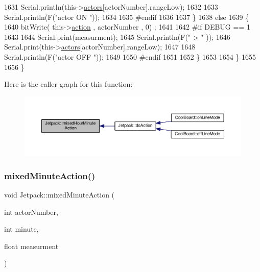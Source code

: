 \begin{DoxyCode}
1631             Serial.println(this->\hyperlink{class_jetpack_a7e16d2f97837f9712a2e6de1c50d99db}{actors}[actorNumber].rangeLow);
1632 
1633             Serial.println(F(\textcolor{stringliteral}{"actor ON "}));
1634 
1635 \textcolor{preprocessor}{        #endif  }
1636 
1637         \}
1638         \textcolor{keywordflow}{else} 
1639         \{
1640             bitWrite( this->\hyperlink{class_jetpack_aca3142925a7b0834b34ae91d26af7765}{action} , actorNumber , 0) ;
1641 
1642 \textcolor{preprocessor}{        #if DEBUG == 1 }
1643 
1644             Serial.print(measurment);
1645             Serial.println(F(\textcolor{stringliteral}{" > "} ));
1646             Serial.print(this->\hyperlink{class_jetpack_a7e16d2f97837f9712a2e6de1c50d99db}{actors}[actorNumber].rangeLow);
1647 
1648             Serial.println(F(\textcolor{stringliteral}{"actor OFF "}));
1649 
1650 \textcolor{preprocessor}{        #endif  }
1651             
1652         \}
1653     
1654     \}
1655 
1656 \}
\end{DoxyCode}
Here is the caller graph for this function\+:\nopagebreak
\begin{figure}[H]
\begin{center}
\leavevmode
\includegraphics[width=350pt]{df/d1d/class_jetpack_a273dae1517b56f0242e28b8944edc26b_icgraph}
\end{center}
\end{figure}
\mbox{\label{class_jetpack_acf8ed1fb594b9e8e224f4ed872a8e093}} 
\subsubsection{\texorpdfstring{mixed\+Minute\+Action()}{mixedMinuteAction()}}
{\footnotesize\ttfamily void Jetpack\+::mixed\+Minute\+Action (\begin{DoxyParamCaption}\item[{int}]{actor\+Number,  }\item[{int}]{minute,  }\item[{float}]{measurment }\end{DoxyParamCaption})}


